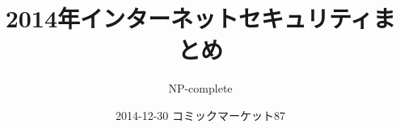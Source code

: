 \title{2014年インターネットセキュリティまとめ}
\author{NP-complete}
\date{2014-12-30 コミックマーケット87}
\Huge
\maketitle
\normalsize
